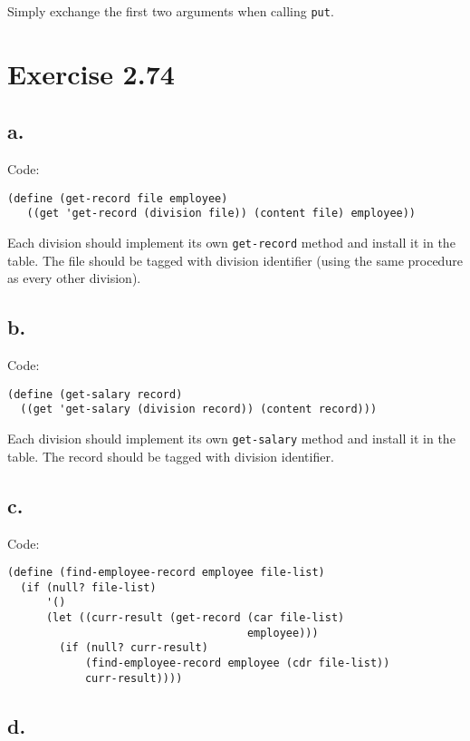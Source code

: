 \documentclass[../main.tex]{subfiles}
\begin{document}
Simply exchange the first two arguments when calling
 \lstinline{put}.
 
\section{Exercise 2.74}

\subsection{a.}

Code:

\begin{lstlisting}
(define (get-record file employee)
   ((get 'get-record (division file)) (content file) employee))
\end{lstlisting}

Each division should implement its own
 \lstinline{get-record} method and install
 it in the table. The file should be tagged
 with division identifier (using the same
 procedure as every other division).

\subsection{b.}

Code:

\begin{lstlisting}
(define (get-salary record)
  ((get 'get-salary (division record)) (content record)))
\end{lstlisting}

Each division should implement its own
 \lstinline{get-salary} method and install
 it in the table. The record should be tagged
 with division identifier.

\subsection{c.}

Code:

\begin{lstlisting}
(define (find-employee-record employee file-list)
  (if (null? file-list)
      '()
      (let ((curr-result (get-record (car file-list)
                                     employee)))
        (if (null? curr-result)
            (find-employee-record employee (cdr file-list))
            curr-result))))
\end{lstlisting}

\subsection{d.}
\end{document}
